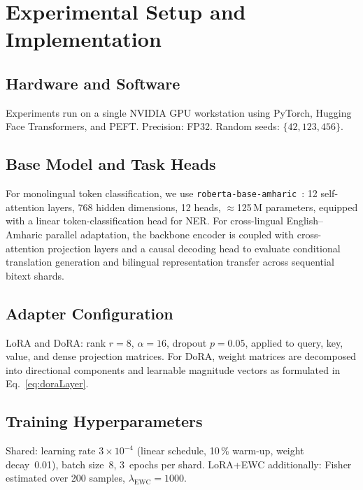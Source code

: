 \documentclass[11pt,a4paper]{article}
\begin{document}
\section{Experimental Setup and Implementation}
\label{sec:expsetup}

\subsection{Hardware and Software}

Experiments run on a single NVIDIA GPU workstation using PyTorch,
Hugging Face Transformers, and PEFT.  Precision: FP32.  Random seeds:
$\{42, 123, 456\}$.

\subsection{Base Model and Task Heads}

For monolingual token classification, we use
\texttt{roberta-base-amharic}~\cite{Yohannes2022,Marilign2025}: 12
self-attention layers, 768 hidden dimensions, 12 heads, $\approx$125\,M
parameters, equipped with a linear token-classification head for NER.
For cross-lingual English--Amharic parallel adaptation, the backbone
encoder is coupled with cross-attention projection layers and a causal
decoding head to evaluate conditional translation generation and
bilingual representation transfer across sequential bitext shards.

\subsection{Adapter Configuration}

LoRA and DoRA: rank $r = 8$, $\alpha = 16$, dropout $p = 0.05$,
applied to query, key, value, and dense projection matrices.
For DoRA, weight matrices are decomposed into directional components
and learnable magnitude vectors as formulated in Eq.~\eqref{eq:doraLayer}.

\subsection{Training Hyperparameters}

Shared: learning rate $3 \times 10^{-4}$ (linear schedule, 10\,\%
warm-up, weight decay~0.01), batch size~8, 3~epochs per shard.
LoRA+EWC additionally: Fisher estimated over 200 samples,
$\lambda_{\text{EWC}} = 1000$.
\end{document}
